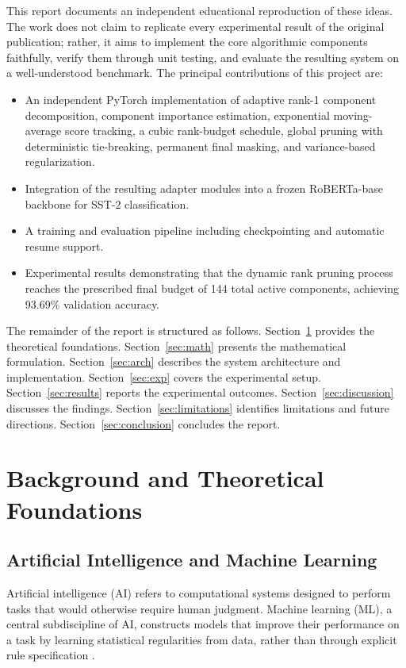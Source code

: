 \documentclass[conference]{IEEEtran}
\begin{document}
This report documents an independent educational reproduction
of these ideas. The work does not claim to replicate every
experimental result of the original publication; rather, it
aims to implement the core algorithmic components faithfully,
verify them through unit testing, and evaluate the resulting
system on a well-understood benchmark. The principal
contributions of this project are:
\begin{itemize}
  \item An independent PyTorch implementation of adaptive
    rank-1 component decomposition, component importance
    estimation, exponential moving-average score tracking, a
    cubic rank-budget schedule, global pruning with
    deterministic tie-breaking, permanent final masking, and
    variance-based regularization.
  \item Integration of the resulting adapter modules into a
    frozen RoBERTa-base backbone for SST-2 classification.
  \item A training and evaluation pipeline including
    checkpointing and automatic resume support.
  \item Experimental results demonstrating that the dynamic
    rank pruning process reaches the prescribed final budget
    of 144 total active components, achieving 93.69\%
    validation accuracy.
\end{itemize}

The remainder of the report is structured as follows.
Section~\ref{sec:background} provides the theoretical
foundations. Section~\ref{sec:math} presents the mathematical
formulation. Section~\ref{sec:arch} describes the system
architecture and implementation. Section~\ref{sec:exp} covers
the experimental setup. Section~\ref{sec:results} reports the
experimental outcomes. Section~\ref{sec:discussion} discusses
the findings. Section~\ref{sec:limitations} identifies
limitations and future directions. Section~\ref{sec:conclusion}
concludes the report.

\section{Background and Theoretical Foundations}
\label{sec:background}

\subsection{Artificial Intelligence and Machine Learning}
Artificial intelligence (AI) refers to computational systems
designed to perform tasks that would otherwise require human
judgment. Machine learning (ML), a central subdiscipline of
AI, constructs models that improve their performance on a
task by learning statistical regularities from data, rather
than through explicit rule specification \cite{goodfellow2016dl}.
\end{document}
